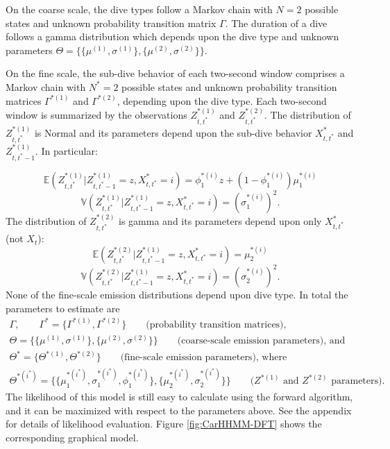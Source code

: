 On the coarse scale, the dive types follow a Markov chain with $N=2$ possible states and unknown probability transition matrix $\Gamma$. The duration of a dive follows a gamma distribution which depends upon the dive type and unknown parameters $\Theta = \{\{\mu^{(1)},\sigma^{(1)}\},\{\mu^{(2)},\sigma^{(2)}\}\}$.

On the fine scale, the sub-dive behavior of each two-second window comprises a Markov chain with $N^*=2$ possible states and unknown probability transition matrices $\Gamma^{*(1)}$ and $\Gamma^{*(2)}$, depending upon the dive type. Each two-second window is summarized by the observations $Z^{*(1)}_{t,t^*}$ and $Z^{*(2)}_{t,t^*}$. The distribution of $Z^{*(1)}_{t,t^*}$ is Normal and its parameters depend upon the sub-dive behavior $X^*_{t,t^*}$ and $Z^{*(1)}_{t,t^*-1}$. In particular:

$$\mathbb{E}(Z^{*(1)}_{t,t^*}|Z^{*(1)}_{t,t^*-1} = z,X^*_{t,t^*} = i) = \phi_1^{*(i)}z + (1-\phi_1^{*(i)}) \mu_1^{*(i)}$$
$$\mathbb{V}(Z^{*(1)}_{t,t^*}|Z^{*(1)}_{t,t^*-1} = z,X^*_{t,t^*} = i) = \left(\sigma_1^{*(i)}\right)^2.$$
%
The distribution of $Z^{*(2)}_{t,t^*}$ is gamma and its parameters depend upon only $X^*_{t,t^*}$ (not $X_t$):
%
$$\mathbb{E}(Z^{*(2)}_{t,t^*}|Z^{*(1)}_{t,t^*-1} = z,X^*_{t,t^*} = i) = \mu_2^{*(i)}$$
$$\mathbb{V}(Z^{*(2)}_{t,t^*}|Z^{*(1)}_{t,t^*-1} = z,X^*_{t,t^*} = i) = \left(\sigma_2^{*(i)}\right)^2.$$
%
None of the fine-scale emission distributions depend upon dive type. In total the parameters to estimate are
%
\begin{gather*}
    \Gamma, \qquad \Gamma^{*} = \{\Gamma^{*(1)},\Gamma^{*(2)}\} \qquad \text{(probability transition matrices)}, \\
    \Theta = \{\{\mu^{(1)},\sigma^{(1)}\},\{\mu^{(2)},\sigma^{(2)}\}\} \qquad \text{(coarse-scale emission parameters), and} \\
    \Theta^* = \{\Theta^{*(1)},\Theta^{*(2)}\}  \qquad \text{(fine-scale emission parameters), where} \\
    \Theta^{*(i^*)} =  \{\{\mu_1^{*(i^*)},\sigma_1^{*(i^*)},\phi_1^{*(i^*)}\},\{\mu_2^{*(i^*)},\sigma_2^{*(i^*)}\}\} \qquad \text{(}Z^{*(1)} \text{ and } Z^{*(2)} \text{ parameters).}
\end{gather*}
%
The likelihood of this model is still easy to calculate using the forward algorithm, and it can be maximized with respect to the parameters above. See the appendix for details of likelihood evaluation. Figure \ref{fig:CarHHMM-DFT} shows the corresponding graphical model.

